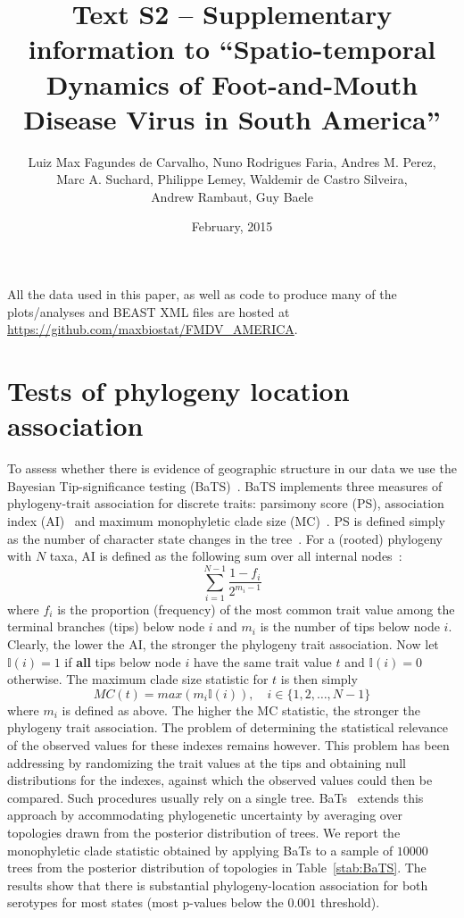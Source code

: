 \documentclass[a4paper,10pt]{article}
\title{Text S2 -- Supplementary information to ``Spatio-temporal Dynamics of Foot-and-Mouth Disease Virus in South America''}
\author{
Luiz Max Fagundes de Carvalho, Nuno Rodrigues Faria, Andres M. Perez,\\
Marc A. Suchard, Philippe Lemey, Waldemir de Castro Silveira,\\
Andrew Rambaut, Guy Baele
}
\date{February, 2015}
\begin{document}
\maketitle

All the data used in this paper, as well as code to produce many of the plots/analyses and BEAST XML files are hosted at \url{https://github.com/maxbiostat/FMDV_AMERICA}.

\section*{Tests of phylogeny location association}

To assess whether there is evidence of geographic structure in our data we use the Bayesian Tip-significance testing (BaTS)~\cite{M-bats}.
BaTS implements three measures of phylogeny-trait association for discrete traits: parsimony score (PS), association index (AI)~\cite{Wang2001} and maximum monophyletic clade size (MC)~\cite{Salemi2005}.
PS is defined simply as the number of character state changes in the tree~\cite{Fitch1971}.
For a (rooted) phylogeny with $N$ taxa, AI is defined as the following sum over all internal nodes~\cite{Wang2001}:
\begin{equation}
 \sum_{i=1}^{N-1}\frac{1-f_i}{2^{m_i - 1}}
\end{equation}
where $f_i$ is the proportion (frequency) of the most common trait value among the terminal branches (tips) below node $i$ and $m_i$ is the number of tips below node $i$.
Clearly, the lower the AI, the stronger the phylogeny trait association.
Now let $\mathbb{I}(i) = 1$ if \textbf{all} tips below node $i$ have the same trait value $t$ and $\mathbb{I}(i) = 0$ otherwise.
The maximum clade size statistic for $t$ is then simply~\cite{Salemi2005}
\begin{equation}
MC(t) = max(m_i\mathbb{I}(i)), \quad i \in \{1, 2, \ldots, N-1\} 
\end{equation}
where $m_i$ is defined as above.
The higher the MC statistic, the stronger the phylogeny trait association.
The problem of determining the statistical relevance of the observed values for these indexes remains however.
This problem has been addressing by randomizing the trait values at the tips and obtaining null distributions for the indexes, against which the observed values could then be compared.
Such procedures usually rely on a single tree.
BaTs~\cite{M-bats} extends this approach by accommodating phylogenetic uncertainty by averaging over topologies drawn from the posterior distribution of trees.
We report the monophyletic clade statistic obtained by applying BaTs to a sample of $10 000$ trees from the posterior distribution of topologies in Table~\ref{stab:BaTS}.
The results show that there is substantial phylogeny-location association for both serotypes for most states (most p-values below the $0.001$ threshold).
\end{document}
